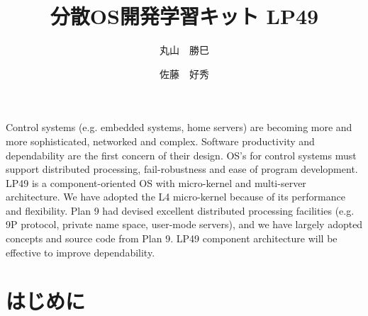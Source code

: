 \documentclass[draft]{ipsjpapers}
\begin{document}
\title[分散OS開発学習キット LP49]  %
	{分散OS開発学習キット LP49}

\author{丸山　勝巳\and
	佐藤　好秀}
	

\begin{abstract}



 
\end{abstract}

\begin{eabstract}
  Control systems (e.g. embedded systems, home servers) are becoming more and more sophisticated, 
networked and complex. 
Software productivity and dependability are the first concern of their design. 
OS’s for control systems must support distributed processing, 
fail-robustness and ease of program development. 
LP49 is a component-oriented OS with micro-kernel and multi-server architecture. 
We have adopted the L4 micro-kernel because of its performance and flexibility. 
Plan 9 had devised excellent distributed processing facilities 
(e.g. 9P protocol, private name space, user-mode servers), 
and we have largely adopted concepts and source code from Plan 9. 
LP49 component architecture will be effective to improve dependability.

\end{eabstract}

\maketitle


\section{はじめに}
\end{document}
